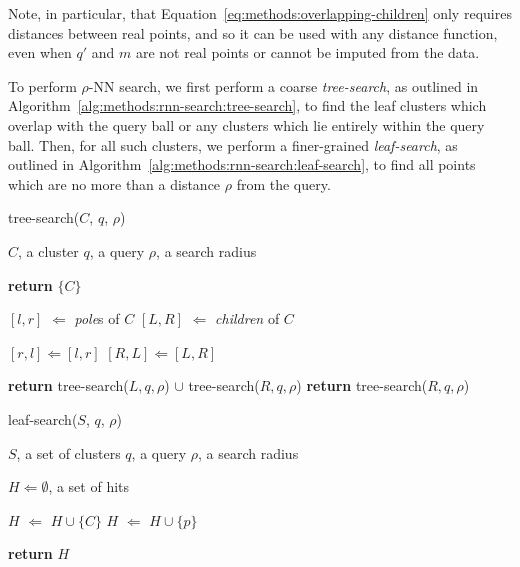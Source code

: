 Note, in particular, that Equation~\ref{eq:methods:overlapping-children} only requires distances between real points, and so it can be used with any distance function, even when $q'$ and $m$ are not real points or cannot be imputed from the data.

To perform $\rho$-NN search, we first perform a coarse \textit{tree-search}, as outlined in Algorithm~\ref{alg:methods:rnn-search:tree-search}, to find the leaf clusters which overlap with the query ball or any clusters which lie entirely within the query ball.
Then, for all such clusters, we perform a finer-grained \textit{leaf-search}, as outlined in Algorithm~\ref{alg:methods:rnn-search:leaf-search}, to find all points which are no more than a distance $\rho$ from the query.

\begin{algorithm} 
    \caption{tree-search($C$, $q$, $\rho$)} 
    \label{alg:methods:rnn-search:tree-search} 
    \begin{algorithmic}
        \REQUIRE $C$, a cluster
        \REQUIRE $q$, a query
        \REQUIRE $\rho$, a search radius

            \STATE \textbf{return} $\{C\}$
        \ELSE

            \STATE $[l, r]$ $\Leftarrow$ \textit{pole}s of $C$
            \STATE $[L, R]$ $\Leftarrow$ \textit{children} of $C$

                \STATE $[r, l] \Leftarrow [l, r]$
                \STATE $[R, L] \Leftarrow [L, R]$
            \ENDIF

                \STATE \textbf{return} tree-search($L, q, \rho$) $\cup$ tree-search($R, q, \rho$)
            \ELSE
                \STATE \textbf{return} tree-search($R, q, \rho$)
            \ENDIF
        \ENDIF
    \end{algorithmic}
\end{algorithm}

\begin{algorithm} 
    \caption{leaf-search($S$, $q$, $\rho$)} 
    \label{alg:methods:rnn-search:leaf-search} 
    \begin{algorithmic}
        \REQUIRE $S$, a set of clusters
        \REQUIRE $q$, a query
        \REQUIRE $\rho$, a search radius

        \STATE $H \Leftarrow \emptyset$, a set of hits

                \STATE $H$ $\Leftarrow$ $H \cup \{C\}$
            \ELSE
                        \STATE $H$ $\Leftarrow$ $H \cup \{p\}$
                    \ENDIF
                \ENDFOR
            \ENDIF
        \ENDFOR

        \STATE \textbf{return} $H$
    \end{algorithmic}
\end{algorithm}


